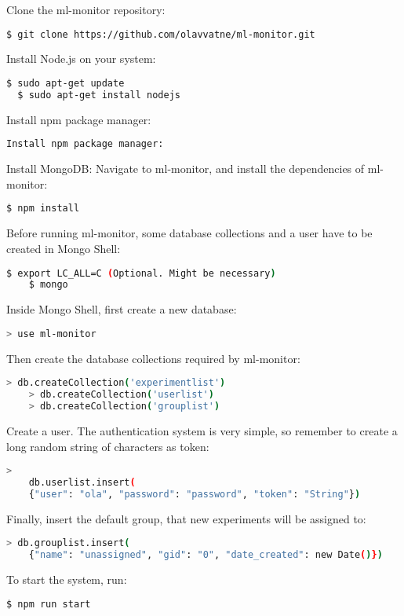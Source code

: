 \noindent Clone the ml-monitor repository:
\begin{lstlisting}[language=bash]
  $ git clone https://github.com/olavvatne/ml-monitor.git
\end{lstlisting}

\noindent Install Node.js on your system:
\begin{lstlisting}[language=bash]
  $ sudo apt-get update
  $ sudo apt-get install nodejs
\end{lstlisting}

\noindent Install npm package manager:
\begin{lstlisting}[language=bash]
    Install npm package manager:
\end{lstlisting}

\noindent Install MongoDB:
\noindent Navigate to ml-monitor, and install the dependencies of ml-monitor:
\begin{lstlisting}[language=bash]
    $ npm install
\end{lstlisting}

\noindent Before running ml-monitor, some database collections and a user have to be created in Mongo Shell:
\begin{lstlisting}[language=bash]
    $ export LC_ALL=C (Optional. Might be necessary)
    $ mongo
\end{lstlisting}


\noindent Inside Mongo Shell, first create a new database:
\begin{lstlisting}[language=bash]
    > use ml-monitor
\end{lstlisting}

\noindent Then create the database collections required by ml-monitor:
\begin{lstlisting}[language=bash]
    > db.createCollection('experimentlist')
    > db.createCollection('userlist')
    > db.createCollection('grouplist')
\end{lstlisting}

\noindent Create a user. The authentication system is very simple, so remember to create a long random string of characters as token:
\begin{lstlisting}[language=bash]> 
    db.userlist.insert(
    {"user": "ola", "password": "password", "token": "String"})
\end{lstlisting}

\noindent Finally, insert the default group, that new experiments will be assigned to:
\begin{lstlisting}[language=bash]
    > db.grouplist.insert(
    {"name": "unassigned", "gid": "0", "date_created": new Date()})
\end{lstlisting}

\noindent To start the system, run:
\begin{lstlisting}[language=bash]
    $ npm run start
\end{lstlisting}